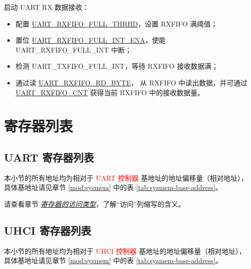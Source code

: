 \documentclass[main\_\_CN.tex]{subfiles}
\begin{document}
启动 UART RX 数据接收：
\begin{itemize}
    \item 配置 \hyperref[fielddesc:UARTRXFIFOFULLTHRHD]{UART\_RXFIFO\_FULL\_THRHD}，设置 RXFIFO 满阈值；
    \item 置位 \hyperref[fielddesc:UARTRXFIFOFULLINTENA]{UART\_RXFIFO\_FULL\_INT\_ENA}，使能 UART\_RXFIFO\_FULL\_INT 中断；
    \item 检测 UART\_TXFIFO\_FULL\_INT，等待 RXFIFO 接收数据满；
    \item 通过读 \hyperref[fielddesc:UARTRXFIFORDBYTE]{UART\_RXFIFO\_RD\_BYTE}， 从 RXFIFO 中读出数据，并可通过 \hyperref[fielddesc:UARTRXFIFOCNT]{UART\_RXFIFO\_CNT} 获得当前 RXFIFO 中的接收数据量。
\end{itemize}



\clearpage
\hypertarget{uart-reg-summ}{}
\section{寄存器列表}
\label{sec:uart-reg-summ}

\subsection{UART 寄存器列表}

本小节的所有地址均为相对于 \textcolor{red}{UART 控制器} 基地址的地址偏移量（相对地址），具体基地址请见章节 \ref{mod:sysmem} \textit{} 中的表 \ref{tab:sysmem-base-address}。

请查看章节 \hyperref[glossary-access-types]{\textit{寄存器的访问类型}}，了解“访问”列缩写的含义。



\subsection{UHCI 寄存器列表}

本小节的所有地址均为相对于 \textcolor{red}{UHCI 控制器} 基地址的地址偏移量（相对地址），具体基地址请见章节 \ref{mod:sysmem} \textit{} 中的表 \ref{tab:sysmem-base-address}。
\end{document}
